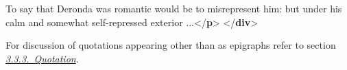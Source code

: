 \begin{shaded}
\hspace*{1em}\mbox{}\newline 
{}\mbox{}\newline 
{}To say that Deronda was romantic would be to\mbox{}\newline 
\hspace*{1em}\hspace*{1em} misrepresent him: but under his calm and somewhat\mbox{}\newline 
\hspace*{1em}\hspace*{1em} self-repressed exterior ...{</\textbf{p}>}\mbox{}\newline 
{</\textbf{div}>}\end{shaded}\egroup\par \noindent  \par
For discussion of quotations appearing other than as epigraphs refer to section \textit{\hyperref[COHQQ]{3.3.3.\ Quotation}}.\par
